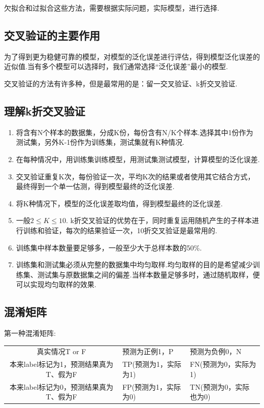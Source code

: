 欠拟合和过拟合这些方法，需要根据实际问题，实际模型，进行选择.

\subsection{交叉验证的主要作用}\label{ux4ea4ux53c9ux9a8cux8bc1ux7684ux4e3bux8981ux4f5cux7528}

​
为了得到更为稳健可靠的模型，对模型的泛化误差进行评估，得到模型泛化误差的近似值.当有多个模型可以选择时，我们通常选择``泛化误差''最小的模型.

​ 交叉验证的方法有许多种，但是最常用的是：留一交叉验证、k折交叉验证.

\subsection{理解k折交叉验证}\label{ux7406ux89e3kux6298ux4ea4ux53c9ux9a8cux8bc1}

\begin{enumerate}
\def\labelenumi{\arabic{enumi}.}
\item
  将含有N个样本的数据集，分成K份，每份含有N/K个样本.选择其中1份作为测试集，另外K-1份作为训练集，测试集就有K种情况.
\item
  在每种情况中，用训练集训练模型，用测试集测试模型，计算模型的泛化误差.
\item
  交叉验证重复K次，每份验证一次，平均K次的结果或者使用其它结合方式，最终得到一个单一估测，得到模型最终的泛化误差.
\item
  将K种情况下，模型的泛化误差取均值，得到模型最终的泛化误差.\\
\item
  一般$2\leqslant K \leqslant10$.
  k折交叉验证的优势在于，同时重复运用随机产生的子样本进行训练和验证，每次的结果验证一次，10折交叉验证是最常用的.
\item
  训练集中样本数量要足够多，一般至少大于总样本数的50\%.
\item
  训练集和测试集必须从完整的数据集中均匀取样.均匀取样的目的是希望减少训练集、测试集与原数据集之间的偏差.当样本数量足够多时，通过随机取样，便可以实现均匀取样的效果.
\end{enumerate}

\subsection{混淆矩阵}\label{ux6df7ux6dc6ux77e9ux9635}

第一种混淆矩阵:

\begin{longtable}[]{ cll }
真实情况T or F & 预测为正例1，P & 预测为负例0，N\tabularnewline
本来label标记为1，预测结果真为T、假为F & TP(预测为1，实际为1) &
FN(预测为0，实际为1)\tabularnewline
本来label标记为0，预测结果真为T、假为F & FP(预测为1，实际为0) &
TN(预测为0，实际也为0)\tabularnewline
\end{longtable}

